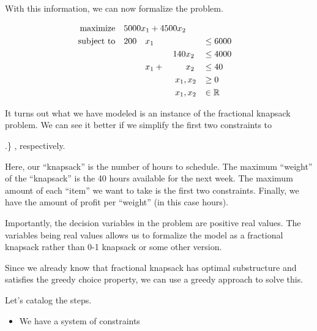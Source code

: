 \documentclass[12pt,letterpaper]{article}
\begin{document}
\begin{enumerate}
      With this information, we can now formalize the problem.

      \begin{alignat*}{7}
        \text{maximize}   \quad \rlap{$5000 x_1 + 4500 x_2$}                                        \\
        \text{subject to} \quad & 200 & x_1 &       &     &                   && \leq 6000          \\
                                &     &     &       & 140 & x_2               && \leq 4000          \\
                                &     & x_1 & {}+{} &     & x_2               && \leq 40            \\
                                &     &     &       &     & \clap{$x_1, x_2$} && \geq 0             \\
                                &     &     &       &     & \clap{$x_1, x_2$} && \in  \mathbb{R}    \\
      \end{alignat*}

      It turns out what we have modeled is an instance of the fractional knapsack problem.
      We can see it better if we simplify the first two constraints to

      \sysdelim.\}
      , respectively.

      Here, our ``knapsack'' is the number of hours to schedule.
      The maximum ``weight'' of the ``knapsack'' is the 40 hours available for the next week.
      The maximum amount of each ``item'' we want to take is the first two constraints.
      Finally, we have the amount of profit per ``weight'' (in this case hours).

      Importantly, the decision variables in the problem are positive real values.
      The variables being real values allows us to formalize the model as a fractional knapsack rather than 0-1 knapsack or some other version.

      Since we already know that fractional knapsack has optimal substructure and
      satisfies the greedy choice property,
      we can use a greedy approach to solve this.

      Let's catalog the steps.

      \begin{itemize}
        \item
          We have a system of constraints


\end{itemize}
\end{enumerate}
\end{document}
